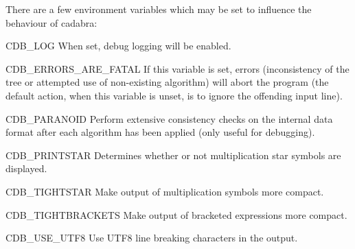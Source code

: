 \documentclass[11pt]{article}
\makeatletter
\numberwithin{equation}{section}
\newenvironment{descerate}
  {\enumerate
   \@noitemargtrue \let\@noitemargfalse\relax
   \renewcommand\makelabel[1]{%
     \hspace\labelwidth
     \llap{\@itemlabel}%
     \hspace\labelsep
     \textbf{##1}%
   }%
  }%
  {\endenumerate}
\makeatother
\begin{document}
There are a few environment variables which may be set to influence
the behaviour of cadabra:
\begin{descerate}
\item[CDB\_LOG]  When set, debug logging will be
  enabled.
\item[CDB\_ERRORS\_ARE\_FATAL]  If this
  variable is set, errors (inconsistency of the tree or attempted use
  of non-existing algorithm) will abort the program  (the default
  action, when this variable is unset, is to ignore the offending input line).
\item[CDB\_PARANOID]  Perform extensive consistency checks on the
  internal data format after each algorithm has been applied (only
  useful for debugging).
\item[CDB\_PRINTSTAR]  Determines whether or not multiplication star
  symbols are displayed.
\item[CDB\_TIGHTSTAR]  Make output of multiplication symbols more compact.
\item[CDB\_TIGHTBRACKETS]  Make output of bracketed expressions more
  compact.
\item[CDB\_USE\_UTF8]  Use UTF8 line breaking characters in the output.
\end{descerate}

% 
\end{document}

